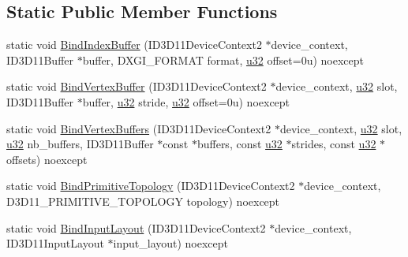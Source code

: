 \subsection*{Static Public Member Functions}
\begin{DoxyCompactItemize}
\item 
static void \hyperlink{structmage_1_1_pipeline_1_1_i_a_a4cb956f13ecfe1baf714df278da743c2}{Bind\+Index\+Buffer} (I\+D3\+D11\+Device\+Context2 $\ast$device\+\_\+context, I\+D3\+D11\+Buffer $\ast$buffer, D\+X\+G\+I\+\_\+\+F\+O\+R\+M\+AT format, \hyperlink{namespacemage_af2b398bf98eb10351f49cad73fe2cc73}{u32} offset=0u) noexcept
\item 
static void \hyperlink{structmage_1_1_pipeline_1_1_i_a_aa9c29a0ee78a0bb4be54654dee7a21d5}{Bind\+Vertex\+Buffer} (I\+D3\+D11\+Device\+Context2 $\ast$device\+\_\+context, \hyperlink{namespacemage_af2b398bf98eb10351f49cad73fe2cc73}{u32} slot, I\+D3\+D11\+Buffer $\ast$buffer, \hyperlink{namespacemage_af2b398bf98eb10351f49cad73fe2cc73}{u32} stride, \hyperlink{namespacemage_af2b398bf98eb10351f49cad73fe2cc73}{u32} offset=0u) noexcept
\item 
static void \hyperlink{structmage_1_1_pipeline_1_1_i_a_aec8cae8e2634a188c566552fc0f380bd}{Bind\+Vertex\+Buffers} (I\+D3\+D11\+Device\+Context2 $\ast$device\+\_\+context, \hyperlink{namespacemage_af2b398bf98eb10351f49cad73fe2cc73}{u32} slot, \hyperlink{namespacemage_af2b398bf98eb10351f49cad73fe2cc73}{u32} nb\+\_\+buffers, I\+D3\+D11\+Buffer $\ast$const $\ast$buffers, const \hyperlink{namespacemage_af2b398bf98eb10351f49cad73fe2cc73}{u32} $\ast$strides, const \hyperlink{namespacemage_af2b398bf98eb10351f49cad73fe2cc73}{u32} $\ast$offsets) noexcept
\item 
static void \hyperlink{structmage_1_1_pipeline_1_1_i_a_a85a1ef979962c1dabfd888367a65195c}{Bind\+Primitive\+Topology} (I\+D3\+D11\+Device\+Context2 $\ast$device\+\_\+context, D3\+D11\+\_\+\+P\+R\+I\+M\+I\+T\+I\+V\+E\+\_\+\+T\+O\+P\+O\+L\+O\+GY topology) noexcept
\item 
static void \hyperlink{structmage_1_1_pipeline_1_1_i_a_a5bf76608b2b5b4f51fc20c99ca47694e}{Bind\+Input\+Layout} (I\+D3\+D11\+Device\+Context2 $\ast$device\+\_\+context, I\+D3\+D11\+Input\+Layout $\ast$input\+\_\+layout) noexcept
\end{DoxyCompactItemize}
